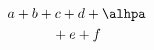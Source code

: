 \documentclass{article}
\begin{document}
\begin{multline*}
a+b+c+d+\alhpa \\
{}+e+f
\end{multline*}
\end{document}
